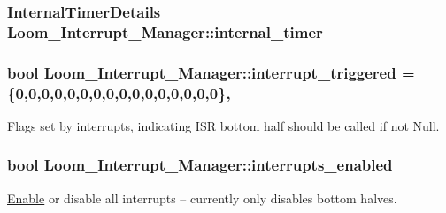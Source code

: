\subsubsection[{\texorpdfstring{internal\+\_\+timer}{internal_timer}}]{\setlength{\rightskip}{0pt plus 5cm}Internal\+Timer\+Details Loom\+\_\+\+Interrupt\+\_\+\+Manager\+::internal\+\_\+timer\hspace{0.3cm}{\ttfamily [protected]}}\hypertarget{class_loom___interrupt___manager_a9a00f26aff65a7294699d3518a3b7e74}{}\label{class_loom___interrupt___manager_a9a00f26aff65a7294699d3518a3b7e74}
\subsubsection[{\texorpdfstring{interrupt\+\_\+triggered}{interrupt_triggered}}]{\setlength{\rightskip}{0pt plus 5cm}bool Loom\+\_\+\+Interrupt\+\_\+\+Manager\+::interrupt\+\_\+triggered = \{0,0,0,0,0,0,0,0,0,0,0,0,0,0,0,0\}\hspace{0.3cm}{\ttfamily [static]}, {\ttfamily [protected]}}\hypertarget{class_loom___interrupt___manager_a12c988c69d8e14c845a736e032ac3575}{}\label{class_loom___interrupt___manager_a12c988c69d8e14c845a736e032ac3575}


Flags set by interrupts, indicating I\+SR bottom half should be called if not Null. 

\subsubsection[{\texorpdfstring{interrupts\+\_\+enabled}{interrupts_enabled}}]{\setlength{\rightskip}{0pt plus 5cm}bool Loom\+\_\+\+Interrupt\+\_\+\+Manager\+::interrupts\+\_\+enabled\hspace{0.3cm}{\ttfamily [protected]}}\hypertarget{class_loom___interrupt___manager_a042032ad0c2ed2748e1d2849dcae1a2f}{}\label{class_loom___interrupt___manager_a042032ad0c2ed2748e1d2849dcae1a2f}


\hyperlink{namespace_enable}{Enable} or disable all interrupts -- currently only disables bottom halves. 

